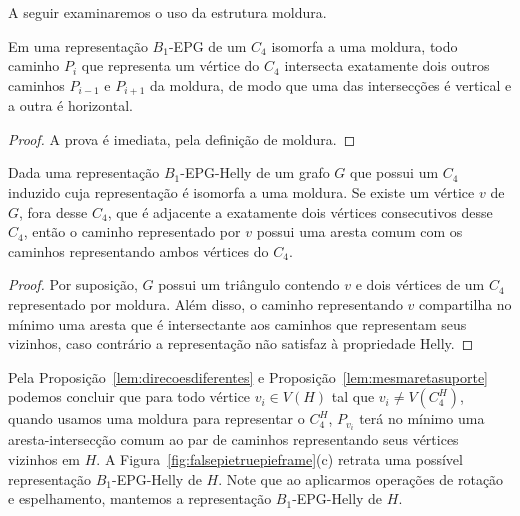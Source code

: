 A seguir examinaremos o uso da estrutura moldura.


\begin{proposition}\label{lem:direcoesdiferentes}
Em uma representação $B_1$-EPG de um $C_4$ isomorfa a uma moldura, todo caminho  $P_i$ que representa um vértice do $C_4$ intersecta exatamente dois outros caminhos $P_{i-1}$ e $P_{i+1}$ da moldura, de modo que uma das intersecções é vertical e a outra é horizontal. %
\end{proposition}

\begin{proof}
A prova é imediata, pela definição de moldura.
 \end{proof}

\begin{proposition}\label{lem:mesmaretasuporte}
Dada uma representação $B_1$-EPG-Helly de um grafo $G$ que possui um $C_4$ induzido cuja representação é isomorfa a uma moldura. Se existe um vértice $v$ de $G$, fora desse $C_4$, que é adjacente a exatamente dois vértices consecutivos desse $C_4$, então o caminho representado por  $v$ possui uma aresta comum com os caminhos representando ambos vértices do $C_4$.%
\end{proposition}

\begin{proof}
Por suposição, $G$ possui um triângulo contendo  $v$ e dois vértices de um $C_4$ representado por moldura. Além disso, o caminho representando  $v$ compartilha no mínimo uma aresta que é intersectante aos caminhos que representam seus vizinhos, caso contrário a representação não satisfaz à propriedade Helly.
 \end{proof}


Pela Proposição~\ref{lem:direcoesdiferentes} e Proposição~\ref{lem:mesmaretasuporte} podemos concluir que para todo vértice   $v_i \in V(H)$ tal que $v_i \neq V(C_4^{H})$, quando usamos uma moldura para representar o $C_4^{H}$, $P_{v_i}$ terá no mínimo uma aresta-intersecção comum ao par de caminhos representando seus vértices vizinhos em $H$. 
A Figura~\ref{fig:falsepietruepieframe}(c) retrata uma possível representação $B_{1}$-EPG-Helly de $H$. 
Note que ao aplicarmos operações de rotação e espelhamento, mantemos a representação $B_1$-EPG-Helly de $H$.

